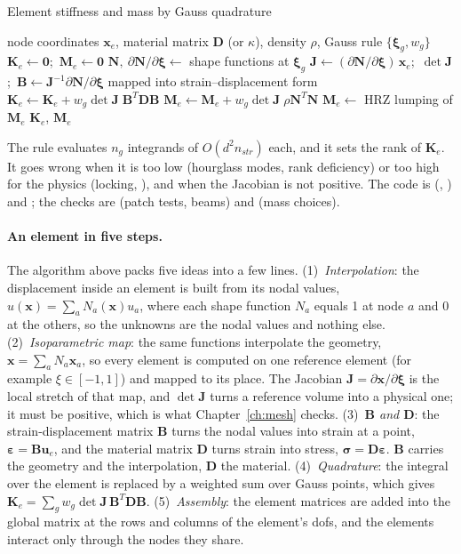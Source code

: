 \begin{algbox}{Element stiffness and mass by Gauss quadrature}
\begin{pseudo}
\Require node coordinates $\bm x_e$, material matrix $\bm D$ (or $\kappa$), density $\rho$, Gauss rule $\{\bm\xi_g,w_g\}$
\State $\bm K_e\gets\bm 0$;\ $\bm M_e\gets\bm 0$
  \State $\bm N,\ \partial\bm N/\partial\bm\xi\gets$ shape functions at $\bm\xi_g$
  \State $\bm J\gets(\partial\bm N/\partial\bm\xi)\,\bm x_e$;\ $\det\bm J$;\ $\bm B\gets\bm J^{-1}\partial\bm N/\partial\bm\xi$ mapped into strain--displacement form
  \State $\bm K_e\gets\bm K_e+w_g\det\bm J\;\bm B^T\bm D\bm B$
  \State $\bm M_e\gets\bm M_e+w_g\det\bm J\;\rho\bm N^T\bm N$
\EndFor
{}
  \State $\bm M_e\gets$ HRZ lumping of $\bm M_e$ 
\EndIf
\Ensure $\bm K_e$, $\bm M_e$
\end{pseudo}
\end{algbox}

The rule evaluates $n_g$ integrands of $O(d^2n_{str})$ each, and it sets the rank of $\bm K_e$. It goes wrong when it is too low (hourglass modes, rank deficiency) or too high for the physics (locking, ), and when the Jacobian is not positive. The code is  (, ) and ; the checks are  (patch tests, beams) and  (mass choices).

\paragraph{An element in five steps.} The algorithm above packs five ideas into a few lines. (1)~\emph{Interpolation}: the displacement inside an element is built from its nodal values, $u(\bm x)=\sum_aN_a(\bm x)u_a$, where each shape function $N_a$ equals 1 at node $a$ and 0 at the others, so the unknowns are the nodal values and nothing else. (2)~\emph{Isoparametric map}: the same functions interpolate the geometry, $\bm x=\sum_aN_a\bm x_a$, so every element is computed on one reference element (for example $\xi\in[-1,1]$) and mapped to its place. The Jacobian $\bm J=\partial\bm x/\partial\bm\xi$ is the local stretch of that map, and $\det\bm J$ turns a reference volume into a physical one; it must be positive, which is what Chapter~\ref{ch:mesh} checks. (3)~\emph{$\bm B$ and $\bm D$}: the strain-displacement matrix $\bm B$ turns the nodal values into strain at a point, $\bm\varepsilon=\bm B\bm u_e$, and the material matrix $\bm D$ turns strain into stress, $\bm\sigma=\bm D\bm\varepsilon$. $\bm B$ carries the geometry and the interpolation, $\bm D$ the material. (4)~\emph{Quadrature}: the integral over the element is replaced by a weighted sum over Gauss points, which gives $\bm K_e=\sum_gw_g\det\bm J\,\bm B^T\bm D\bm B$. (5)~\emph{Assembly}: the element matrices are added into the global matrix at the rows and columns of the element's dofs, and the elements interact only through the nodes they share.

